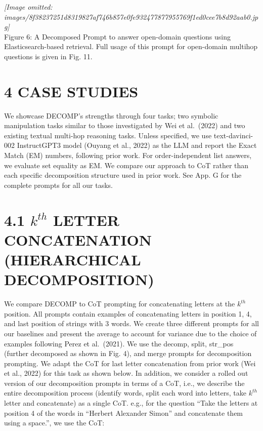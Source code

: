 \documentclass[
]{article}
\begin{document}
\textit{[Image omitted: images/8f38237251d8319827af746b857e0fe932477877955769f1ed0cee7b8d92aab0.jpg]}\\
Figure 6: A Decomposed Prompt to answer open-domain questions using
Elasticsearch-based retrieval. Full usage of this prompt for open-domain
multihop questions is given in Fig. 11.

\section{4 CASE STUDIES}\label{case-studies}

We showcase DECOMP's strengths through four tasks; two symbolic
manipulation tasks similar to those investigated by Wei et al.~(2022)
and two existing textual multi-hop reasoning tasks. Unless specified, we
use text-davinci-002 InstructGPT3 model (Ouyang et al., 2022) as the LLM
and report the Exact Match (EM) numbers, following prior work. For
order-independent list answers, we evaluate set equality as EM. We
compare our approach to CoT rather than each specific decomposition
structure used in prior work. See App. G for the complete prompts for
all our tasks.

\section{\texorpdfstring{4.1 \(k^{th}\) LETTER CONCATENATION
(HIERARCHICAL
DECOMPOSITION)}{4.1 k\^{}\{th\} LETTER CONCATENATION (HIERARCHICAL DECOMPOSITION)}}\label{kth-letter-concatenation-hierarchical-decomposition}

We compare DECOMP to CoT prompting for concatenating letters at the
\(k^{th}\) position. All prompts contain examples of concatenating
letters in position 1, 4, and last position of strings with 3 words. We
create three different prompts for all our baselines and present the
average to account for variance due to the choice of examples following
Perez et al.~(2021). We use the decomp, split, str\_pos (further
decomposed as shown in Fig. 4), and merge prompts for decomposition
prompting. We adapt the CoT for last letter concatenation from prior
work (Wei et al., 2022) for this task as shown below. In addition, we
consider a rolled out version of our decomposition prompts in terms of a
CoT, i.e., we describe the entire decomposition process (identify words,
split each word into letters, take \(k^{th}\) letter and concatenate) as
a single CoT. e.g., for the question ``Take the letters at position 4 of
the words in ``Herbert Alexander Simon'' and concatenate them using a
space.'', we use the CoT:
\end{document}
